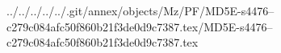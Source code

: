 ../../../../../.git/annex/objects/Mz/PF/MD5E-s4476--c279c084afc50f860b21f3de0d9c7387.tex/MD5E-s4476--c279c084afc50f860b21f3de0d9c7387.tex
